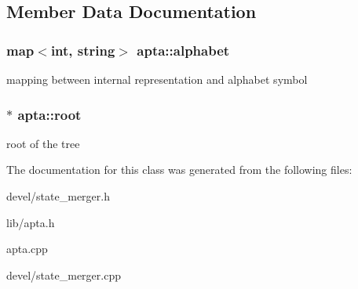 \subsection{Member Data Documentation}
\subsubsection[{\texorpdfstring{alphabet}{alphabet}}]{\setlength{\rightskip}{0pt plus 5cm}map$<$int, string$>$ apta\+::alphabet}\hypertarget{classapta_a36490cd60aae771985948b4defdf6bcb}{}\label{classapta_a36490cd60aae771985948b4defdf6bcb}
mapping between internal representation and alphabet symbol 
\subsubsection[{\texorpdfstring{root}{root}}]{ $\ast$ apta\+::root}\hypertarget{classapta_a949591494b3e64716c9f200cc27e5828}{}\label{classapta_a949591494b3e64716c9f200cc27e5828}
root of the tree 

The documentation for this class was generated from the following files\+:\begin{DoxyCompactItemize}
\item 
devel/state\+\_\+merger.\+h\item 
lib/apta.\+h\item 
apta.\+cpp\item 
devel/state\+\_\+merger.\+cpp\end{DoxyCompactItemize}
